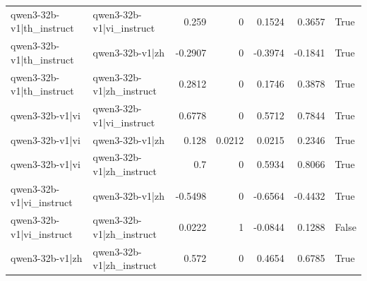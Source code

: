 \begin{table}
\begin{tabular}{l l r r r r l}
qwen3-32b-v1|th_instruct & qwen3-32b-v1|vi_instruct & 0.259 & 0 & 0.1524 & 0.3657 & True \\
qwen3-32b-v1|th_instruct & qwen3-32b-v1|zh & -0.2907 & 0 & -0.3974 & -0.1841 & True \\
qwen3-32b-v1|th_instruct & qwen3-32b-v1|zh_instruct & 0.2812 & 0 & 0.1746 & 0.3878 & True \\
qwen3-32b-v1|vi & qwen3-32b-v1|vi_instruct & 0.6778 & 0 & 0.5712 & 0.7844 & True \\
qwen3-32b-v1|vi & qwen3-32b-v1|zh & 0.128 & 0.0212 & 0.0215 & 0.2346 & True \\
qwen3-32b-v1|vi & qwen3-32b-v1|zh_instruct & 0.7 & 0 & 0.5934 & 0.8066 & True \\
qwen3-32b-v1|vi_instruct & qwen3-32b-v1|zh & -0.5498 & 0 & -0.6564 & -0.4432 & True \\
qwen3-32b-v1|vi_instruct & qwen3-32b-v1|zh_instruct & 0.0222 & 1 & -0.0844 & 0.1288 & False \\
qwen3-32b-v1|zh & qwen3-32b-v1|zh_instruct & 0.572 & 0 & 0.4654 & 0.6785 & True \\
\bottomrule
\end{tabular}
\end{table}
